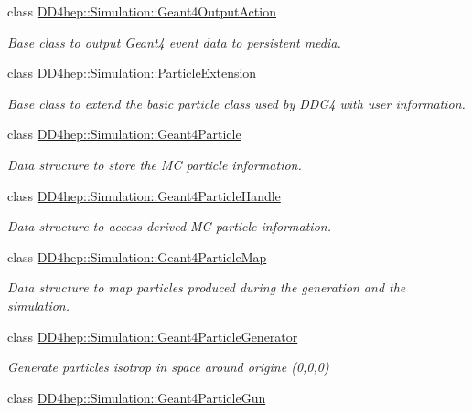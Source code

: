 \begin{DoxyCompactItemize}
class \hyperlink{class_d_d4hep_1_1_simulation_1_1_geant4_output_action}{D\+D4hep\+::\+Simulation\+::\+Geant4\+Output\+Action}
\begin{DoxyCompactList}\small\item\em Base class to output Geant4 event data to persistent media. \end{DoxyCompactList}\item 
class \hyperlink{class_d_d4hep_1_1_simulation_1_1_particle_extension}{D\+D4hep\+::\+Simulation\+::\+Particle\+Extension}
\begin{DoxyCompactList}\small\item\em Base class to extend the basic particle class used by D\+D\+G4 with user information. \end{DoxyCompactList}\item 
class \hyperlink{class_d_d4hep_1_1_simulation_1_1_geant4_particle}{D\+D4hep\+::\+Simulation\+::\+Geant4\+Particle}
\begin{DoxyCompactList}\small\item\em Data structure to store the MC particle information. \end{DoxyCompactList}\item 
class \hyperlink{class_d_d4hep_1_1_simulation_1_1_geant4_particle_handle}{D\+D4hep\+::\+Simulation\+::\+Geant4\+Particle\+Handle}
\begin{DoxyCompactList}\small\item\em Data structure to access derived MC particle information. \end{DoxyCompactList}\item 
class \hyperlink{class_d_d4hep_1_1_simulation_1_1_geant4_particle_map}{D\+D4hep\+::\+Simulation\+::\+Geant4\+Particle\+Map}
\begin{DoxyCompactList}\small\item\em Data structure to map particles produced during the generation and the simulation. \end{DoxyCompactList}\item 
class \hyperlink{class_d_d4hep_1_1_simulation_1_1_geant4_particle_generator}{D\+D4hep\+::\+Simulation\+::\+Geant4\+Particle\+Generator}
\begin{DoxyCompactList}\small\item\em Generate particles isotrop in space around origine (0,0,0) \end{DoxyCompactList}\item 
class \hyperlink{class_d_d4hep_1_1_simulation_1_1_geant4_particle_gun}{D\+D4hep\+::\+Simulation\+::\+Geant4\+Particle\+Gun}

\end{DoxyCompactItemize}
